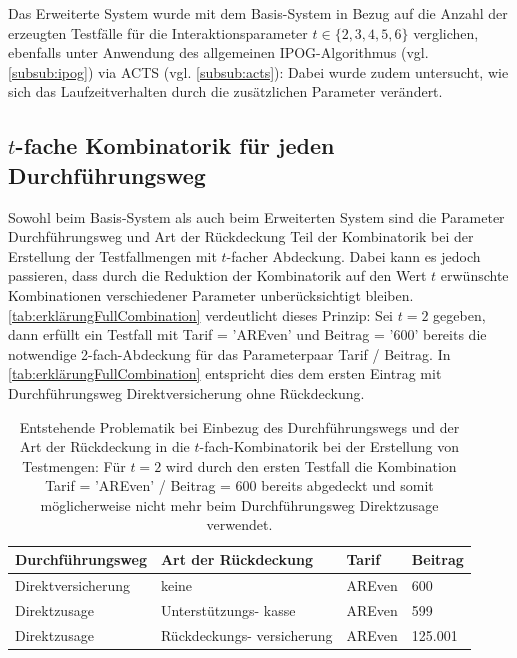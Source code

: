 Das Erweiterte System wurde mit dem Basis-System in Bezug auf die Anzahl der erzeugten Testfälle für die Interaktionsparameter $t \in \{2,3,4,5,6\}$ verglichen, ebenfalls unter Anwendung des allgemeinen IPOG-Algorithmus (vgl. \autoref{subsub:ipog}) via ACTS (vgl. \autoref{subsub:acts}): Dabei wurde zudem untersucht, wie sich das Laufzeitverhalten durch die zusätzlichen Parameter verändert.

\subsection{$t$-fache Kombinatorik für jeden Durchführungsweg}\label{subsec:ImplFullCombinations}

Sowohl beim Basis-System als auch beim Erweiterten System sind die Parameter Durchführungsweg und Art der Rückdeckung Teil der Kombinatorik bei der Erstellung der Testfallmengen mit $t$-facher Abdeckung. Dabei kann es jedoch passieren, dass durch die Reduktion der Kombinatorik auf den Wert $t$ erwünschte Kombinationen verschiedener Parameter unberücksichtigt bleiben. \autoref{tab:erklärungFullCombination} verdeutlicht dieses Prinzip: Sei $t=2$ gegeben, dann erfüllt ein Testfall mit Tarif = 'AREven' und Beitrag = '600' bereits die notwendige 2-fach-Abdeckung für das Parameterpaar Tarif / Beitrag. In \autoref{tab:erklärungFullCombination} entspricht dies dem ersten Eintrag mit Durchführungsweg Direktversicherung ohne Rückdeckung.

\renewcommand{\arraystretch}{2}
\begin{table}[!htb]
\footnotesize
\begin{tabular}{|M{\tabOther}|M{\tabOther}|M{\tabBeitrag}|M{\tabBeitrag}|}
\hline
{}Durchführungsweg & Art der Rückdeckung & Tarif & Beitrag \\ \hline
Direktversicherung      & keine                     & AREven   & 600   \\ \hline
Direktzusage       & Unterstützungs- kasse & AREven    & 599    \\ \hline
Direktzusage       & Rückdeckungs- versicherung & AREven    & 125.001     \\ \hline
\end{tabular}
\normalsize
\caption{Entstehende Problematik bei Einbezug des Durchführungswegs und der Art der Rückdeckung in die $t$-fach-Kombinatorik bei der Erstellung von Testmengen: Für $t=2$ wird durch den ersten Testfall die Kombination Tarif = 'AREven' / Beitrag = 600 bereits abgedeckt und somit möglicherweise nicht mehr beim Durchführungsweg Direktzusage verwendet.}
\label{tab:erklärungFullCombination}
\end{table}
\renewcommand{\arraystretch}{1.5}

